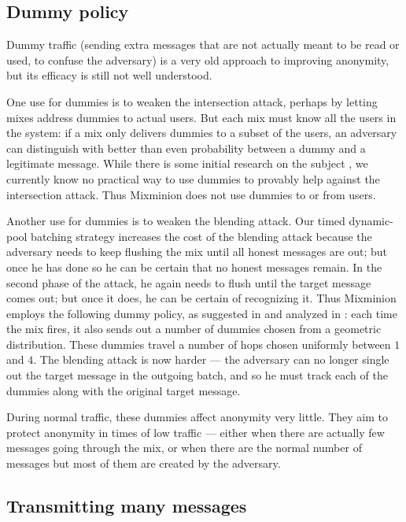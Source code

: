 \documentclass[11pt]{IEEEtran}
\begin{document}
\subsection{Dummy policy}

Dummy traffic (sending extra messages that are not actually meant to
be read or used, to confuse the adversary) is a very old approach to
improving anonymity, but its efficacy is still not well understood.

One use for dummies is to weaken the intersection attack, perhaps
by letting mixes address dummies to actual users. But each mix must
know all the users in the system: if a mix only delivers dummies to a
subset of the users, an adversary can distinguish with better than even
probability between a dummy and a legitimate message. While there is
some initial research on the subject \cite{langos02}, we currently know no
practical way to use dummies to provably help against the intersection
attack. Thus Mixminion does not use dummies to or from users.

Another use for dummies is to weaken the blending attack. Our timed
dynamic-pool batching strategy increases the cost of the blending attack
because the adversary needs to keep flushing the mix until all honest
messages are out; but once he has done so he can be certain that no
honest messages remain. In the second phase of the attack, he again
needs to flush until the target message comes out; but once it does, he
can be certain of recognizing it. Thus Mixminion employs the following
dummy policy, as suggested in \cite{batching-taxonomy} and analyzed in 
\cite{andrei-claudia}: each time the mix
fires, it also sends out a number of dummies chosen from a geometric
distribution. These dummies travel a number of hops chosen uniformly
between $1$ and $4$. The blending attack is now harder --- the adversary
can no longer single out the target message in the outgoing batch, and so
he must track each of the dummies along with the original target message.

During normal traffic, these dummies affect anonymity very little. They
aim to protect anonymity in times of low traffic --- either when
there are actually few messages going through the mix,
or when there are the normal number of messages but most of them are
created by the adversary.

\subsection{Transmitting many messages}
\end{document}
